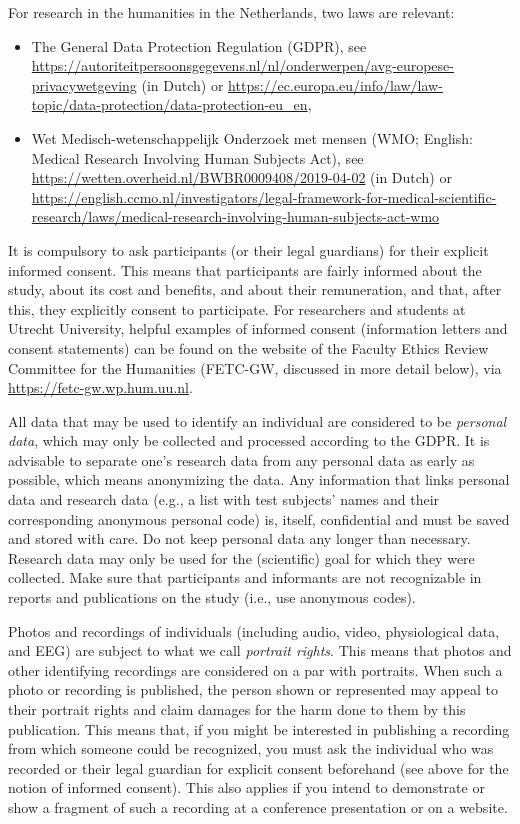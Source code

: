 \documentclass[
]{book}
\begin{document}
For research in the humanities in the Netherlands, two laws are relevant:

\begin{itemize}
\item
  The General Data Protection Regulation (GDPR), see \url{https://autoriteitpersoonsgegevens.nl/nl/onderwerpen/avg-europese-privacywetgeving} (in Dutch) or \url{https://ec.europa.eu/info/law/law-topic/data-protection/data-protection-eu_en},
\item
  Wet Medisch-wetenschappelijk Onderzoek met mensen (WMO; English: Medical Research Involving Human Subjects Act), see \url{https://wetten.overheid.nl/BWBR0009408/2019-04-02} (in Dutch) or \url{https://english.ccmo.nl/investigators/legal-framework-for-medical-scientific-research/laws/medical-research-involving-human-subjects-act-wmo}
\end{itemize}

It is compulsory to ask participants (or their legal guardians) for their explicit informed consent. This means that participants are fairly informed about the study, about its cost and benefits, and about their remuneration, and that, after this, they explicitly consent to participate. For researchers and students at Utrecht University, helpful examples of informed consent (information letters and consent statements) can be found on the website of the Faculty Ethics Review Committee for the Humanities (FETC-GW, discussed in more detail below), via \url{https://fetc-gw.wp.hum.uu.nl}.

All data that may be used to identify an individual are considered to be \emph{personal data}, which may only be collected and processed according to the GDPR. It is advisable to separate one's research data from any personal data as early as possible, which means anonymizing the data. Any information that links personal data and research data (e.g., a list with test subjects' names and their corresponding anonymous personal code) is, itself, confidential and must be saved and stored with care. Do not keep personal data any longer than necessary. Research data may only be used for the (scientific) goal for which they were collected. Make sure that participants and informants are not recognizable in reports and publications on the study (i.e., use anonymous codes).

Photos and recordings of individuals (including audio, video, physiological data, and EEG) are subject to what we call \emph{portrait rights}. This means that photos and other identifying recordings are considered on a par with portraits. When such a photo or recording is published, the person shown or represented may appeal to their portrait rights and claim damages for the harm done to them by this publication. This means that, if you might be interested in publishing a recording from which someone could be recognized, you must ask the individual who was recorded or their legal guardian for explicit consent beforehand (see above for the notion of informed consent). This also applies if you intend to demonstrate or show a fragment of such a recording at a conference presentation or on a website.
\end{document}
